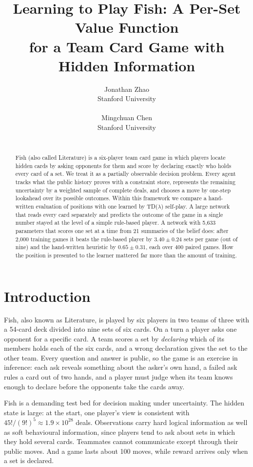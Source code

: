 \documentclass{article}
\title{Learning to Play Fish: A Per-Set Value Function\\
  for a Team Card Game with Hidden Information}
\author{%
  Jonathan Zhao \\
  Stanford University \\
  \texttt{\emailJonathan} \\
  \And
  Mingchuan Chen \\
  Stanford University \\
  \texttt{\emailMingchuan} \\
}
\begin{document}
\maketitle

\begin{abstract}
  Fish (also called Literature) is a six-player team card game in which players
  locate hidden cards by asking opponents for them and score by declaring
  exactly who holds every card of a set.  We treat it as a partially observable
  decision problem.  Every agent tracks what the public history proves with a
  constraint store, represents the remaining uncertainty by a weighted sample of
  complete deals, and chooses a move by one-step lookahead over its possible
  outcomes.  Within this framework we compare a hand-written evaluation of
  positions with one learned by TD($\lambda$) self-play.  A large network that
  reads every card separately and predicts the outcome of the game in a single
  number stayed at the level of a simple rule-based player.  A network with
  5,633 parameters that scores one set
  at a time from 21 summaries of the belief does: after 2,000 training games it
  beats the rule-based player by $3.40 \pm 0.24$ sets per game (out of nine) and
  the hand-written heuristic by $0.65 \pm 0.31$, each over 400 paired games.
  How the position is presented to the learner mattered far more than the
  amount of training.
\end{abstract}

\section{Introduction}

Fish, also known as Literature, is played by six players in two teams of three
with a 54-card deck divided into nine sets of six cards.  On a turn a player
asks one opponent for a specific card.  A team scores a set by \emph{declaring}
which of its members holds each of the six cards, and a wrong declaration gives
the set to the other team.  Every question and answer is public, so the game is
an exercise in inference: each ask reveals something about the asker's own
hand, a failed ask rules a card out of two hands, and a player must judge when
its team knows enough to declare before the opponents take the cards away.

Fish is a demanding test bed for decision making under uncertainty.  The
hidden state is large: at the start, one player's view is
consistent with $45!/(9!)^5 \approx 1.9 \times 10^{28}$ deals.  Observations
carry hard logical information as well as soft behavioural information, since
players tend to ask about sets in which they hold several cards.  Teammates
cannot communicate except through their public moves.  And a game lasts about
100 moves, while reward arrives only when a set is declared.
\end{document}

